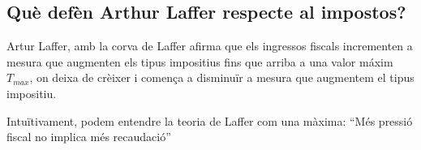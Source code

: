 \subsection{Què defèn Arthur Laffer respecte al impostos?}
 
Artur Laffer, amb la corva de Laffer afirma que els
ingressos fiscals incrementen a mesura que augmenten els tipus impositius
fins que arriba a una valor máxim $T_{max}$, on deixa de crèixer i comença
a disminuïr a mesura que augmentem el tipus impositiu.
 
Intuïtivament, podem entendre la teoria de Laffer com una màxima: 
``Més pressió fiscal no implica més recaudació''
